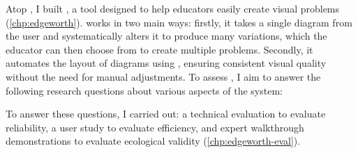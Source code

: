 Atop \Penrose, I built \Edgeworth, a tool designed to help educators easily create visual problems (\cref{chp:edgeworth}). \Edgeworth works in two main ways: firstly, it takes a single diagram from the user and systematically alters it to produce many variations, which the educator can then choose from to create multiple problems. Secondly, it automates the layout of diagrams using \Penrose, ensuring consistent visual quality without the need for manual adjustments. To assess \Edgeworth, I aim to answer the following research questions about various aspects of the system:


To answer these questions, I carried out: a technical evaluation to evaluate reliability, a user study to evaluate efficiency, and expert walkthrough demonstrations to evaluate ecological validity (\cref{chp:edgeworth-eval}). 






